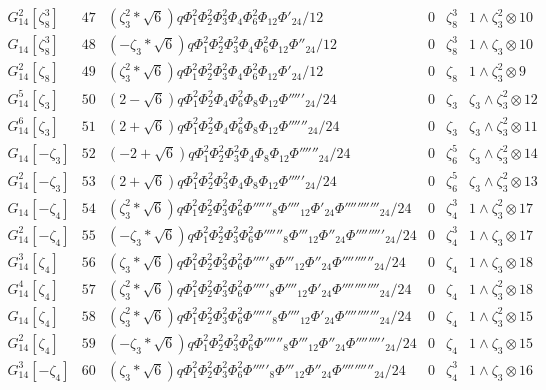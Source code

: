 \documentclass{article}
\begin{document}
$$\begin{array}{c|ccccc}
G_{14}^2[\zeta_8^3]&47&(\zeta_3^2*\sqrt{6})q\Phi_1^2\Phi_2^2\Phi_3^2\Phi_4\Phi_6^2\Phi_{12}\Phi'_{24}/12&0&\zeta_8^3&1\!\wedge\!\zeta_3^2\otimes10\\
G_{14}[\zeta_8^3]&48&(-\zeta_3*\sqrt{6})q\Phi_1^2\Phi_2^2\Phi_3^2\Phi_4\Phi_6^2\Phi_{12}\Phi''_{24}/12&0&\zeta_8^3&1\!\wedge\!\zeta_3\otimes10\\
G_{14}^2[\zeta_8]&49&(\zeta_3^2*\sqrt{6})q\Phi_1^2\Phi_2^2\Phi_3^2\Phi_4\Phi_6^2\Phi_{12}\Phi'_{24}/12&0&\zeta_8&1\!\wedge\!\zeta_3^2\otimes9\\
G_{14}^5[\zeta_3]&50&(2-\sqrt{6})q\Phi_1^2\Phi_2^2\Phi_4\Phi_6^2\Phi_8\Phi_{12}\Phi'''''_{24}/24&0&\zeta_3&\zeta_3\!\wedge\!\zeta_3^2\otimes12\\
G_{14}^6[\zeta_3]&51&(2+\sqrt{6})q\Phi_1^2\Phi_2^2\Phi_4\Phi_6^2\Phi_8\Phi_{12}\Phi''''''_{24}/24&0&\zeta_3&\zeta_3\!\wedge\!\zeta_3^2\otimes11\\
G_{14}[-\zeta_3]&52&(-2+\sqrt{6})q\Phi_1^2\Phi_2^2\Phi_3^2\Phi_4\Phi_8\Phi_{12}\Phi''''''_{24}/24&0&\zeta_6^5&\zeta_3\!\wedge\!\zeta_3^2\otimes14\\
G_{14}^2[-\zeta_3]&53&(2+\sqrt{6})q\Phi_1^2\Phi_2^2\Phi_3^2\Phi_4\Phi_8\Phi_{12}\Phi'''''_{24}/24&0&\zeta_6^5&\zeta_3\!\wedge\!\zeta_3^2\otimes13\\
G_{14}[-\zeta_4]&54&(\zeta_3^2*\sqrt{6})q\Phi_1^2\Phi_2^2\Phi_3^2\Phi_6^2\Phi''''''_8\Phi''''_{12}\Phi'_{24}\Phi'''''''''''_{24}/24&0&\zeta_4^3&1\!\wedge\!\zeta_3^2\otimes17\\
G_{14}^2[-\zeta_4]&55&(-\zeta_3*\sqrt{6})q\Phi_1^2\Phi_2^2\Phi_3^2\Phi_6^2\Phi''''''_8\Phi'''_{12}\Phi''_{24}\Phi'''''''''_{24}/24&0&\zeta_4^3&1\!\wedge\!\zeta_3\otimes17\\
G_{14}^3[\zeta_4]&56&(\zeta_3*\sqrt{6})q\Phi_1^2\Phi_2^2\Phi_3^2\Phi_6^2\Phi'''''_8\Phi'''_{12}\Phi''_{24}\Phi''''''''''_{24}/24&0&\zeta_4&1\!\wedge\!\zeta_3\otimes18\\
G_{14}^4[\zeta_4]&57&(\zeta_3^2*\sqrt{6})q\Phi_1^2\Phi_2^2\Phi_3^2\Phi_6^2\Phi'''''_8\Phi''''_{12}\Phi'_{24}\Phi''''''''''''_{24}/24&0&\zeta_4&1\!\wedge\!\zeta_3^2\otimes18\\
G_{14}[\zeta_4]&58&(\zeta_3^2*\sqrt{6})q\Phi_1^2\Phi_2^2\Phi_3^2\Phi_6^2\Phi''''''_8\Phi''''_{12}\Phi'_{24}\Phi'''''''''''_{24}/24&0&\zeta_4&1\!\wedge\!\zeta_3^2\otimes15\\
G_{14}^2[\zeta_4]&59&(-\zeta_3*\sqrt{6})q\Phi_1^2\Phi_2^2\Phi_3^2\Phi_6^2\Phi''''''_8\Phi'''_{12}\Phi''_{24}\Phi'''''''''_{24}/24&0&\zeta_4&1\!\wedge\!\zeta_3\otimes15\\
G_{14}^3[-\zeta_4]&60&(\zeta_3*\sqrt{6})q\Phi_1^2\Phi_2^2\Phi_3^2\Phi_6^2\Phi'''''_8\Phi'''_{12}\Phi''_{24}\Phi''''''''''_{24}/24&0&\zeta_4^3&1\!\wedge\!\zeta_3\otimes16\\

\end{array}$$
\end{document}
